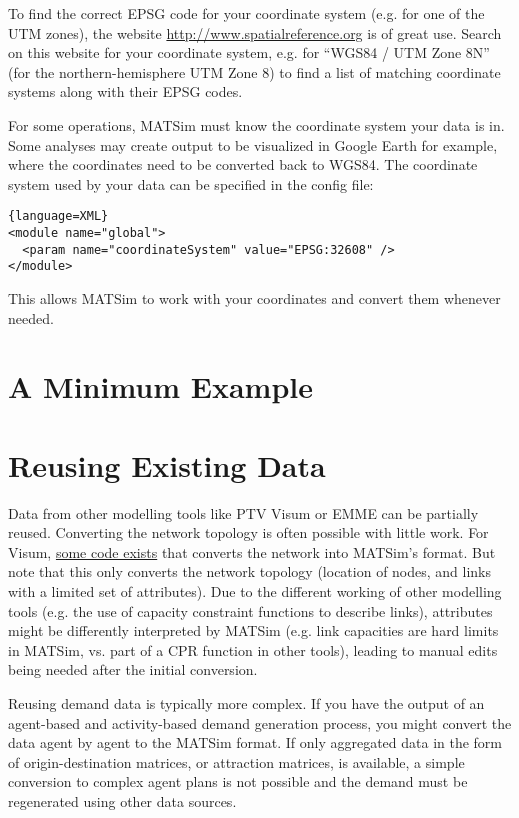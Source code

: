 To find the correct EPSG code for your coordinate system (e.g. for one of the
UTM zones), the website \url{http://www.spatialreference.org} is of great use.
Search on this website for your coordinate system, e.g. for ``WGS84 / UTM Zone
8N'' (for the northern-hemisphere UTM Zone 8) to find a list of matching
coordinate systems along with their EPSG codes.


For some operations, MATSim must know the coordinate system your data is in.
Some analyses may create output to be visualized in Google Earth for example,
where the coordinates need to be converted back to WGS84. The coordinate system
used by your data can be specified in the config file:

\begin{lstlisting}{language=XML}
<module name="global">
  <param name="coordinateSystem" value="EPSG:32608" />
</module>
\end{lstlisting}

This allows MATSim to work with your coordinates and convert them whenever
needed.


\section{A Minimum Example}



\section{Reusing Existing Data}

Data from other modelling tools like PTV Visum or EMME can be partially reused.
Converting the network topology is often possible with little work. For Visum,
\href{http://matsim.org/javadoc/org/matsim/visum/package-summary.html}{some code
exists} that converts the network into MATSim's format. But note that this only
converts the network topology (location of nodes, and links with a limited set
of attributes). Due to the different working of other modelling tools (e.g. the 
use of capacity constraint functions to describe links), attributes might be 
differently interpreted by MATSim (e.g. link capacities are hard limits in MATSim, 
vs. part of a CPR function in other tools), leading to manual edits being needed 
after the initial conversion. 

Reusing demand data is typically more complex. If you have the output of an 
agent-based and activity-based demand generation process, you might convert
the data agent by agent to the MATSim format. If only aggregated data
in the form of origin-destination matrices, or attraction matrices, is available,
a simple conversion to complex agent plans is not possible and the demand must be 
regenerated using other data sources.




